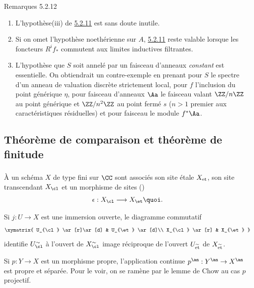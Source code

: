 \begin{enonce*}[remark]{Remarques 5.2.12}
\begin{enumerate}
\renewcommand{\theenumi}{\roman{enumi}}
\renewcommand{\labelenumi}{(\theenumi)}
\item L'hypothèse\pageoriginale (iii) de \hyperref[XVII.thm5.2.11]{5.2.11} est sans doute
inutile.

\item Si on omet l'hypothèse noethérienne sur $A$, \hyperref[XVII.thm5.2.11]{5.2.11} reste
valable lorsque les foncteurs $R^{i}f_{\ast}$ commutent aux limites
inductives filtrantes.

\item L'hypothèse que $S$ soit annelé par un faisceau d'anneaux
\emph{constant} est essentielle. On obtiendrait un contre-exemple en
prenant pour $S$ le spectre d'un anneau de valuation discrète
strictement local, pour $f$ l'inclusion du point générique $\eta$,
pour faisceau d'anneaux $\Aa$ le faisceau valant
$\ZZ/n\ZZ$ au point générique et
$\ZZ/n^{2}\ZZ$ au point fermé $s$ ($n>1$ premier aux
caractéristiques résiduelles) et pour faisceau le module
$f^{\ast}\Aa$.
\end{enumerate}
\end{enonce*}

\subsection{Théorème de comparaison et théorème de finitude}

\subsubsection{}
À un schéma $X$ de type fini sur $\CC$ sont associés son site
étale $X_{\text{\rm et}}$, son site transcendant $X_{\cl}$ et un morphisme de
sites ()
\[
\epsilon:X_{\cl}\longrightarrow X_{\et}{\quoi}.
\]

Si $j:U\rightarrow X$ est une immersion ouverte, le diagramme
commutatif
$$
\xymatrix{
U_{\cl}  \ar[r]\ar[d]   & U_{\et} \ar[d]\\
X_{\cl}  \ar[r] & X_{\et}
}
$$
identifie $U^{\sim}_{\cl}$ à l'ouvert de $X^{\sim}_{\cl}$ image
réciproque de l'ouvert $U_{\widetilde{\text{\rm et}}}$ de
$X_{\widetilde{\text{\rm et}}}$.

Si $p:Y\rightarrow X$ est un morphisme propre, l'application continue
$p^{\an}:Y^{\an}\rightarrow X^{\an}$ est propre et séparée. Pour le
voir, on se ramène par le lemme de Chow au cas $p$ projectif.

